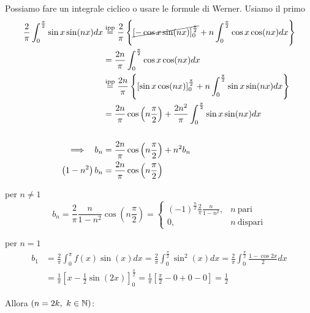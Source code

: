 \begin{enumerate}
Possiamo fare un integrale ciclico o usare le formule di Werner. Usiamo il primo\begin{align*}
\frac{2}{\pi }\int ^{\frac{\pi }{2}}_{0}\sin x\sin(nx) dx & \overset{\text{ipp}}{ = }\frac{2}{\pi }\left\{\cancel{[ - \cos x\sin(nx)]^{\frac{\pi }{2}}_{0}} + n\int ^{\frac{\pi }{2}}_{0}\cos x\cos(nx) dx\right\}\\
 & = \frac{2n}{\pi }\int ^{\frac{\pi }{2}}_{0}\cos x\cos(nx) dx\\
 & \overset{\text{ipp}}{ = }\frac{2n}{\pi }\left\{[\sin x\cos(nx)]^{\frac{\pi }{2}}_{0} + n\int ^{\frac{\pi }{2}}_{0}\sin x\sin(nx) dx\right\}\\
 & = \frac{2n}{\pi }\cos\left(n\frac{\pi }{2}\right) + \frac{2n^{2}}{\pi }\int ^{\frac{\pi }{2}}_{0}\sin x\sin(nx) dx\\
 & \\
\implies \ \ b_{n} & = \frac{2n}{\pi }\cos\left(n\frac{\pi }{2}\right) + n^{2} b_{n}\\
\left(1 - n^{2}\right) b_{n} & = \frac{2n}{\pi }\cos\left(n\frac{\pi }{2}\right)
\end{align*}

per $n\neq 1$\begin{equation*}
b_{n} = \frac{2}{\pi }\frac{n}{1 - n^{2}}\cos\left(n\frac{\pi }{2}\right) = \begin{cases}
(- 1)^{\frac{n}{2}}\frac{2}{\pi }\frac{n}{1 - n^{2}} , & n\ \text{pari}\\
0, & n\ \text{dispari}
\end{cases}
\end{equation*}

per $n = 1$\begin{equation*}
\begin{aligned}
b_{1} & = \frac{2}{\pi }\int ^{\pi }_{0} f(x)\sin(x) dx = \frac{2}{\pi }\int ^{\frac{\pi }{2}}_{0}\sin^{2}(x) dx = \frac{2}{\pi }\int ^{\frac{\pi }{2}}_{0}\frac{1 - \cos 2x}{2} dx\\
 & = \frac{1}{\pi }\left[ x - \frac{1}{2}\sin(2x)\right]^{\frac{\pi }{2}}_{0} = \frac{1}{\pi }\left[\frac{\pi }{2} - 0 + 0 - 0\right] = \frac{1}{2}
\end{aligned}
\end{equation*}

Allora $(n = 2k,\ k\in \mathbb{N})$:


\end{enumerate}
